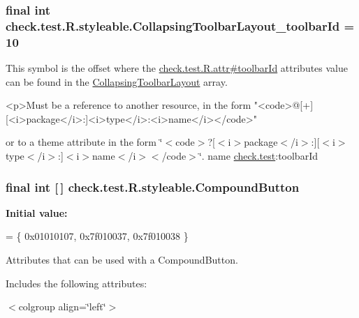 \subsubsection[{Collapsing\+Toolbar\+Layout\+\_\+toolbar\+Id}]{\setlength{\rightskip}{0pt plus 5cm}final int check.\+test.\+R.\+styleable.\+Collapsing\+Toolbar\+Layout\+\_\+toolbar\+Id = 10\hspace{0.3cm}{\ttfamily [static]}}\label{classcheck_1_1test_1_1_r_1_1styleable_ab00225a14bdf82c12e0532781e9bb655}
This symbol is the offset where the \hyperlink{classcheck_1_1test_1_1_r_1_1attr_a115881f8837d9e7f7a0d617a81e74f0a}{check.\+test.\+R.\+attr\#toolbar\+Id} attribute\textquotesingle{}s value can be found in the \hyperlink{classcheck_1_1test_1_1_r_1_1styleable_a0c512120c75d0ddac20063034a72db17}{Collapsing\+Toolbar\+Layout} array.

\begin{DoxyVerb}      <p>Must be a reference to another resource, in the form "<code>@[+][<i>package</i>:]<i>type</i>:<i>name</i></code>"
\end{DoxyVerb}
 or to a theme attribute in the form \char`\"{}$<$code$>$?\mbox{[}$<$i$>$package$<$/i$>$\+:\mbox{]}\mbox{[}$<$i$>$type$<$/i$>$\+:\mbox{]}$<$i$>$name$<$/i$>$$<$/code$>$\char`\"{}.  name \hyperlink{namespacecheck_1_1test}{check.\+test}\+:toolbar\+Id \hypertarget{classcheck_1_1test_1_1_r_1_1styleable_a92450249dab865f0e8cb180e69be8dcf}{}
\subsubsection[{Compound\+Button}]{\setlength{\rightskip}{0pt plus 5cm}final int \mbox{[}$\,$\mbox{]} check.\+test.\+R.\+styleable.\+Compound\+Button\hspace{0.3cm}{\ttfamily [static]}}\label{classcheck_1_1test_1_1_r_1_1styleable_a92450249dab865f0e8cb180e69be8dcf}
{\bfseries Initial value\+:}
\begin{DoxyCode}
= \{
            0x01010107, 0x7f010037, 0x7f010038
        \}
\end{DoxyCode}
Attributes that can be used with a Compound\+Button. 

Includes the following attributes\+:

\begin{TabularC}{0}
\hline
\end{TabularC}
$<$colgroup align=\char`\"{}left\char`\"{}$>$ 

